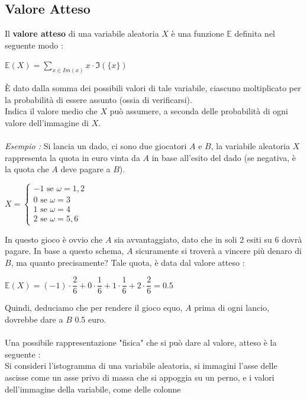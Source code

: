 \documentclass[12pt, letterpaper]{article}
\begin{document}
\subsection{Valore Atteso}
Il \textbf{valore atteso} di una variabile aleatoria \(X\) è una funzione \(\mathbb{E}\) definita nel seguente modo :\begin{center}
   \( \mathbb{E}(X)=\displaystyle\sum_{x\in Im(x)}x\cdot \Im(\{x\})\)
\end{center}
È dato dalla somma dei possibili valori di tale variabile,
ciascuno moltiplicato per la probabilità di essere assunto (ossia di verificarsi).\\
Indica il valore medio che \(X\) può assumere, a seconda delle probabilità di ogni valore dell'immagine di \(X\).
\\\hphantom{}\\\textit{Esempio :} Si lancia un dado, ci sono due giocatori \(A\) e \(B\), la variabile aleatoria \(X\) 
rappresenta la quota in euro vinta da \(A\) in base all'esito del dado (se negativa, è la quota che \(A\) deve pagare 
a \(B\)).\begin{center}
    \(
    X=\begin{cases}
        -1\text{ se }\omega=1,2\\
        0\text{ se  }\omega=3\\
        1\text{  se }\omega=4\\
        2\text{ se  }\omega=5,6
    \end{cases}    
    \)
\end{center}
In questo gioco è ovvio che \(A\) sia avvantaggiato, dato che in soli 2 esiti su 6 dovrà pagare. 
In base a questo schema, \(A\) sicuramente si troverà a vincere più denaro di \(B\), ma quanto precisamente?
Tale quota, è data dal valore atteso :\begin{center}
    \(
    \mathbb{E}(X)=(-1)\cdot\dfrac{2}{6}+0\cdot\dfrac{1}{6}+1\cdot\dfrac{1}{6}+2\cdot\dfrac{2}{6} =0.5   
    \)
\end{center}
Quindi, deduciamo che per rendere il gioco equo, \(A\) prima di ogni lancio, dovrebbe 
dare a \(B\) 0.5 euro.
\\\hphantom{}\\Una possibile rappresentazione "fisica" che si può dare al valore, atteso è la seguente :\\
Si consideri l'istogramma di una variabile aleatoria, si immagini l'asse delle ascisse come un asse 
privo di massa che si appoggia su un perno, e i valori dell'immagine della variabile, come delle colonne 
\end{document}
